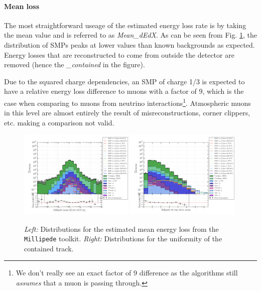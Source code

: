 \paragraph{Mean loss}
The most straightforward useage of the estimated energy loss rate is by taking the mean value and is referred to as \textit{Mean\_dEdX}. As can be seen from Fig. \ref{fig:allmillipedevar1}, the distribution of SMPs peaks at lower values than known backgrounds as expected. Energy losses that are reconstructed to come from outside the detector are removed (hence the \textit{\_contained} in the figure). 

Due to the squared charge dependencies, an SMP of charge 1/3 is expected to have a relative energy loss difference to muons with a factor of 9, which is the case when comparing to muons from neutrino interactions\footnote{We don't really see an exact factor of 9 difference as the algorithms still \textit{assumes} that a muon is passing through.}. Atmospheric muons in this level are almost entirely the result of misreconstructions, corner clippers, etc. making a comparison not valid.

\begin{figure}
\centering
\includegraphics[width=0.49\textwidth]{chapter8/img/1D_stack_millipede_dedx_mean_nozeroes.png}
\includegraphics[width=0.49\textwidth]{chapter8/img/1D_stack_millipede_dedx_runsabovemean.png}
\caption{\textit{Left: }Distributions for the estimated mean energy loss from the \texttt{Millipede} toolkit. \textit{Right: }Distributions for the uniformity of the contained track.}
\label{fig:allmillipedevar1}
\end{figure}

